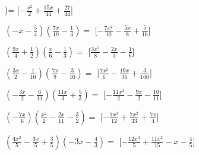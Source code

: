 \begin{esercizio}
\begin{enumeratea}
\right)=\)
  \hfill [\(- \frac{x^{2}}{2} + \frac{15 x}{44} + \frac{27}{44}\)]
\item \(\left(- x - \frac{5}{4}\right)\left(\frac{7 x}{10} - 
\frac{1}{4}\right)=\)
  \hfill [\(- \frac{7 x^{2}}{10} - \frac{5 x}{8} + \frac{5}{16}\)]
\item \(\left(\frac{9 x}{4} + \frac{1}{2}\right)\left(\frac{x}{6} - 
\frac{1}{3}\right)=\)
  \hfill [\(\frac{3 x^{2}}{8} - \frac{2 x}{3} - \frac{1}{6}\)]
\item \(\left(\frac{3 x}{2} - \frac{1}{10}\right)\left(\frac{7 x}{9} - 
\frac{3}{10}\right)=\)
  \hfill [\(\frac{7 x^{2}}{6} - \frac{19 x}{36} + \frac{3}{100}\)]
\item \(\left(- \frac{3 x}{2} - \frac{6}{11}\right)\left(\frac{11 x}{3} + 
\frac{5}{3}\right)=\)
  \hfill [\(- \frac{11 x^{2}}{2} - \frac{9 x}{2} - \frac{10}{11}\)]
\item \(\left(- \frac{7 x}{6}\right)\left(\frac{x^{2}}{2} - \frac{2 x}{11} 
- \frac{3}{2}\right)=\)
  \hfill [\(- \frac{7 x^{3}}{12} + \frac{7 x^{2}}{33} + \frac{7 x}{4}\)]
\item \(\left(\frac{4 x^{2}}{5} - \frac{3 x}{5} + \frac{3}{5}\right)\left(- 
3 x - \frac{4}{3}\right)=\)
  \hfill [\(- \frac{12 x^{3}}{5} + \frac{11 x^{2}}{15} - x - \frac{4}{5}\)]

\end{enumeratea}
\end{esercizio}
